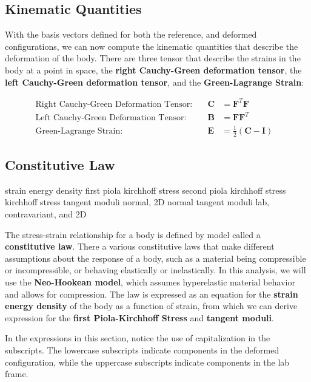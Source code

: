 \documentclass[]{spie}  %
\begin{document}
\subsection{Kinematic Quantities}
With the basis vectors defined for both the reference, and deformed configurations, we can now compute the kinematic quantities that describe the deformation of the body. There are three tensor that describe the strains in the body at a point in space, the \textbf{right Cauchy-Green deformation tensor}, the \textbf{left Cauchy-Green deformation tensor}, and the \textbf{Green-Lagrange Strain}:

\begin{align}
\textrm{Right Cauchy-Green Deformation Tensor:} & \ & \bm{C} 	&= \bm{F}^T\bm{F} & \\
\textrm{Left Cauchy-Green Deformation Tensor:}	& \ & \bm{B}	&= \bm{F}\bm{F}^T & \\
\textrm{Green-Lagrange Strain:}					& \ & \bm{E} 	&= \frac{1}{2}(\bm{C} - \bm{I}) &
\end{align}


\subsection{Constitutive Law}
\label{sec: constitutive law}
strain energy density
first piola kirchhoff stress
second piola kirchhoff stress
kirchhoff stress
tangent moduli normal, 2D normal
tangent moduli lab, contravariant, and 2D

The stress-strain relationship for a body is defined by model called a \textbf{constitutive law}. There a various constitutive laws that make different assumptions about the response of a body, such as a material being compressible or incompressible, or behaving elastically or inelastically. In this analysis, we will use the \textbf{Neo-Hookean model}, which assumes hyperelastic material behavior and allows for compression. The law is expressed as an equation for the \textbf{strain energy density} of the body as a function of strain, from which we can derive expression for the \textbf{first Piola-Kirchhoff Stress} and \textbf{tangent moduli}. 

In the expressions in this section, notice the use of capitalization in the subscripts. The lowercase subscripts indicate components in the deformed configuration, while the uppercase subscripts indicate components in the lab frame. 
\end{document}
